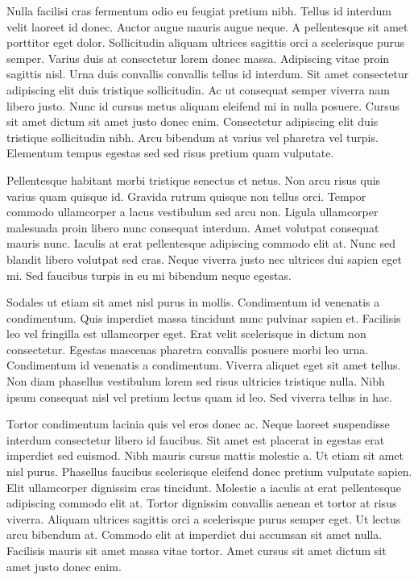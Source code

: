 \documentclass[11pt,a4paper]{article}
\begin{document}
Nulla facilisi cras fermentum odio eu feugiat pretium nibh. Tellus id interdum velit laoreet id donec. Auctor augue mauris augue neque. A pellentesque sit amet porttitor eget dolor. Sollicitudin aliquam ultrices sagittis orci a scelerisque purus semper. Varius duis at consectetur lorem donec massa. Adipiscing vitae proin sagittis nisl. Urna duis convallis convallis tellus id interdum. Sit amet consectetur adipiscing elit duis tristique sollicitudin. Ac ut consequat semper viverra nam libero justo. Nunc id cursus metus aliquam eleifend mi in nulla posuere. Cursus sit amet dictum sit amet justo donec enim. Consectetur adipiscing elit duis tristique sollicitudin nibh. Arcu bibendum at varius vel pharetra vel turpis. Elementum tempus egestas sed sed risus pretium quam vulputate.

Pellentesque habitant morbi tristique senectus et netus. Non arcu risus quis varius quam quisque id. Gravida rutrum quisque non tellus orci. Tempor commodo ullamcorper a lacus vestibulum sed arcu non. Ligula ullamcorper malesuada proin libero nunc consequat interdum. Amet volutpat consequat mauris nunc. Iaculis at erat pellentesque adipiscing commodo elit at. Nunc sed blandit libero volutpat sed cras. Neque viverra justo nec ultrices dui sapien eget mi. Sed faucibus turpis in eu mi bibendum neque egestas.

Sodales ut etiam sit amet nisl purus in mollis. Condimentum id venenatis a condimentum. Quis imperdiet massa tincidunt nunc pulvinar sapien et. Facilisis leo vel fringilla est ullamcorper eget. Erat velit scelerisque in dictum non consectetur. Egestas maecenas pharetra convallis posuere morbi leo urna. Condimentum id venenatis a condimentum. Viverra aliquet eget sit amet tellus. Non diam phasellus vestibulum lorem sed risus ultricies tristique nulla. Nibh ipsum consequat nisl vel pretium lectus quam id leo. Sed viverra tellus in hac.

Tortor condimentum lacinia quis vel eros donec ac. Neque laoreet suspendisse interdum consectetur libero id faucibus. Sit amet est placerat in egestas erat imperdiet sed euismod. Nibh mauris cursus mattis molestie a. Ut etiam sit amet nisl purus. Phasellus faucibus scelerisque eleifend donec pretium vulputate sapien. Elit ullamcorper dignissim cras tincidunt. Molestie a iaculis at erat pellentesque adipiscing commodo elit at. Tortor dignissim convallis aenean et tortor at risus viverra. Aliquam ultrices sagittis orci a scelerisque purus semper eget. Ut lectus arcu bibendum at. Commodo elit at imperdiet dui accumsan sit amet nulla. Facilisis mauris sit amet massa vitae tortor. Amet cursus sit amet dictum sit amet justo donec enim.
\end{document}
